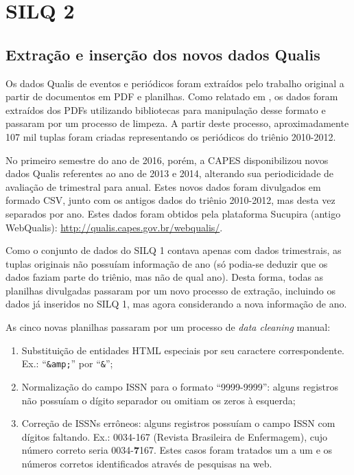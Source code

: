 \documentclass[12pt]{article}
\newcommand{\quotes}[1]{``#1''}
\begin{document}
\section{SILQ 2}

\subsection{Extração e inserção dos novos dados Qualis} \label{sec:extracao-qualis-novo}

Os dados Qualis de eventos e periódicos foram extraídos pelo trabalho original a partir de documentos em PDF e planilhas. Como relatado em \cite[p. 50-52]{Silq1}, os dados foram extraídos dos PDFs utilizando bibliotecas para manipulação desse formato e passaram por um processo de limpeza. A partir deste processo, aproximadamente 107 mil tuplas foram criadas representando os periódicos do triênio 2010-2012.

No primeiro semestre do ano de 2016, porém, a CAPES disponibilizou novos dados Qualis referentes ao ano de 2013 e 2014, alterando sua periodicidade de avaliação de trimestral para anual. Estes novos dados foram divulgados em formado CSV, junto com os antigos dados do triênio 2010-2012, mas desta vez separados por ano. Estes dados foram obtidos pela plataforma Sucupira (antigo WebQualis): \url{http://qualis.capes.gov.br/webqualis/}.

Como o conjunto de dados do SILQ 1 contava apenas com dados trimestrais, as tuplas originais não possuíam informação de ano (só podia-se deduzir que os dados faziam parte do triênio, mas não de qual ano). Desta forma, todas as planilhas divulgadas passaram por um novo processo de extração, incluindo os dados já inseridos no SILQ 1, mas agora considerando a nova informação de ano.

As cinco novas planilhas passaram por um processo de \textit{data cleaning} manual:

\begin{enumerate}

\item Substituição de entidades HTML especiais por seu caractere correspondente. Ex.: \quotes{\texttt{\&amp;}} por \quotes{\texttt{\&}};

\item Normalização do campo ISSN para o formato \quotes{9999-9999}: alguns registros não possuíam o dígito separador ou omitiam os zeros à esquerda;

\item Correção de ISSNs errôneos: alguns registros possuíam o campo ISSN com dígitos faltando. Ex.: 0034-167 (Revista Brasileira de Enfermagem), cujo número correto seria 0034-\textbf{7}167. Estes casos foram tratados um a um e os números corretos identificados através de pesquisas na web.

\end{enumerate}
\end{document}

